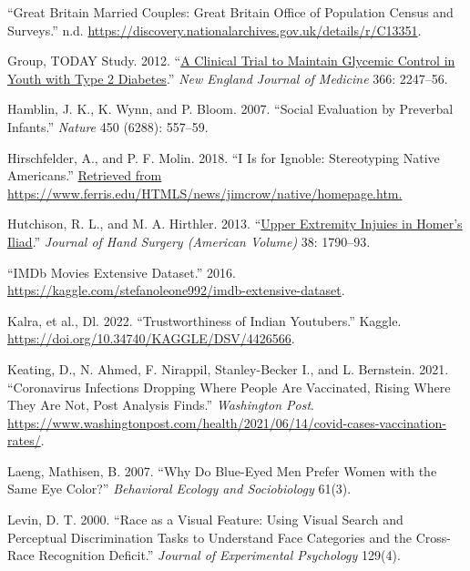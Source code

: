 \documentclass[
]{report}
\newlength{\cslhangindent}
\newenvironment{CSLReferences}[2] %
 {\begin{list}{}{%
  \setlength{\itemindent}{0pt}
  \setlength{\leftmargin}{0pt}
  \setlength{\parsep}{0pt}
  \ifodd #1
   \setlength{\leftmargin}{\cslhangindent}
   \setlength{\itemindent}{-1\cslhangindent}
  \fi
  \setlength{\itemsep}{#2\baselineskip}}}
 {\end{list}}
\begin{document}
\begin{CSLReferences}{1}{0}
{``Great Britain Married Couples: Great Britain Office of Population Census and Surveys.''} n.d. \url{https://discovery.nationalarchives.gov.uk/details/r/C13351}.

Group, TODAY Study. 2012. {``\href{https://www.ncbi.nlm.nih.gov/pubmed/22540912}{A Clinical Trial to Maintain Glycemic Control in Youth with Type 2 Diabetes}.''} \emph{New England Journal of Medicine} 366: 2247--56.

Hamblin, J. K., K. Wynn, and P. Bloom. 2007. {``Social Evaluation by Preverbal Infants.''} \emph{Nature} 450 (6288): 557--59.

Hirschfelder, A., and P. F. Molin. 2018. {``I Is for Ignoble: Stereotyping Native Americans.''} \href{Retrieved\%20from\%20https://www.ferris.edu/HTMLS/news/jimcrow/native/homepage.htm.}{Retrieved from https://www.ferris.edu/HTMLS/news/jimcrow/native/homepage.htm.}

Hutchison, R. L., and M. A. Hirthler. 2013. {``\href{https://www.ncbi.nlm.nih.gov/pubmed/23932117}{Upper Extremity Injuies in Homer's Iliad}.''} \emph{Journal of Hand Surgery (American Volume)} 38: 1790--93.

{``{IMDb} Movies Extensive Dataset.''} 2016. \url{https://kaggle.com/stefanoleone992/imdb-extensive-dataset}.

Kalra, et al., Dl. 2022. {``Trustworthiness of Indian Youtubers.''} Kaggle. \url{https://doi.org/10.34740/KAGGLE/DSV/4426566}.

Keating, D., N. Ahmed, F. Nirappil, Stanley-Becker I., and L. Bernstein. 2021. {``Coronavirus Infections Dropping Where People Are Vaccinated, Rising Where They Are Not, Post Analysis Finds.''} \emph{Washington Post}. \url{https://www.washingtonpost.com/health/2021/06/14/covid-cases-vaccination-rates/}.

Laeng, Mathisen, B. 2007. {``Why Do Blue-Eyed Men Prefer Women with the Same Eye Color?''} \emph{Behavioral Ecology and Sociobiology} 61(3).

Levin, D. T. 2000. {``Race as a Visual Feature: Using Visual Search and Perceptual Discrimination Tasks to Understand Face Categories and the Cross-Race Recognition Deficit.''} \emph{Journal of Experimental Psychology} 129(4).


\end{CSLReferences}
\end{document}
